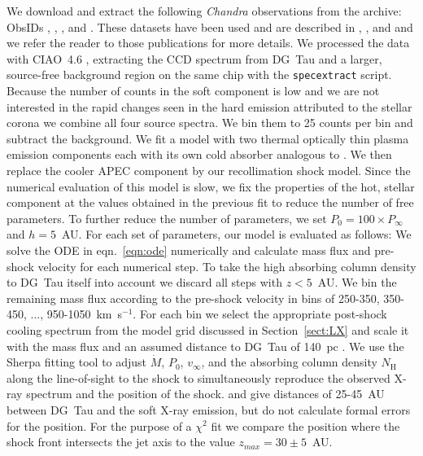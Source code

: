 \documentclass{emulateapj}
\begin{document}
We download and extract the following \emph{Chandra} observations from the archive: ObsIDs , , , and . These datasets have been used and are described in \citet{2008A&A...478..797G}, \citet{2008A&A...488L..13S}, and \citet{2009A&A...493..579G} and we refer the reader to those publications for more details. We processed the data with CIAO~4.6 \citep{2006SPIE.6270E..60F}, extracting the CCD spectrum from DG~Tau and a larger, source-free background region on the same chip with the \texttt{specextract} script. Because the number of counts in the soft component is low and we are not interested in the rapid changes seen in the hard emission attributed to the stellar corona \citep{2008A&A...478..797G} we combine all four source spectra. We bin them to 25 counts per bin and subtract the background. We fit a model with two thermal optically thin plasma emission components \citep[APEC,][]{2012ApJ...756..128F} each with its own cold absorber analogous to \citet{2008A&A...478..797G}. We then replace the cooler APEC component by our recollimation shock model. Since the numerical evaluation of this model is slow, we fix the properties of the hot, stellar component at the values obtained in the previous fit to reduce the number of free parameters. To further reduce the number of parameters, we set $P_0 = 100\times P_\infty$ and $h=5$~AU. For each set of parameters, our model is evaluated as follows: We solve the ODE in eqn.~\ref{eqn:ode} numerically and calculate mass flux and pre-shock velocity for each numerical step. To take the high absorbing column density to DG~Tau itself into account we discard all steps with $z<5$~AU. We bin the remaining mass flux according to the pre-shock velocity in bins of 250-350, 350-450, ..., 950-1050~km~s$^{-1}$. For each bin we select the appropriate post-shock cooling spectrum from the model grid discussed in Section~\ref{sect:LX} and scale it with the mass flux and an assumed distance to DG~Tau of 140~pc \citep{1994AJ....108.1872K}. We use the Sherpa fitting tool \citep{2001SPIE.4477...76F} to adjust $\dot M$, $P_0$, $v_\infty$, and the absorbing column density $N_\textrm{H}$ along the line-of-sight to the shock to simultaneously reproduce the observed X-ray spectrum and the position of the shock. \citet{2008A&A...488L..13S} and \citet{2011ASPC..448..617G} give distances of 25-45~AU between DG~Tau and the soft X-ray emission, but do not calculate formal errors for the position. For the purpose of a $\chi^2$ fit we compare the position where the shock front intersects the jet axis to the value $z_{max} = 30\pm5$~AU.
\end{document}
